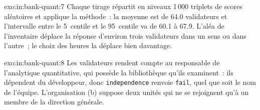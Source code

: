 \begin{solution}{exo:in:bank-quant:7}
Chaque tirage répartit en niveaux 1\,000 triplets de scores aléatoires et applique la méthode~: la moyenne est de 64.0 validateurs et l'intervalle entre le 5~centile
et le 95~centile va de 60.1 à 67.9. L'aléa de l'inventaire déplace la réponse d'environ trois validateurs dans un sens ou dans l'autre~;
le choix des heures la déplace bien davantage.
\end{solution}

\begin{solution}{exo:in:bank-quant:8}
Les validateurs rendent compte au responsable de l'analytique quantitative, qui possède la bibliothèque qu'ils examinent~: ils dépendent du
développeur, donc \texttt{independence} renvoie \texttt{fail}, quel que soit le nom de l'équipe. L'organisation (b) suppose deux unités
qui ne se rejoignent qu'à un membre de la direction générale.
\end{solution}

